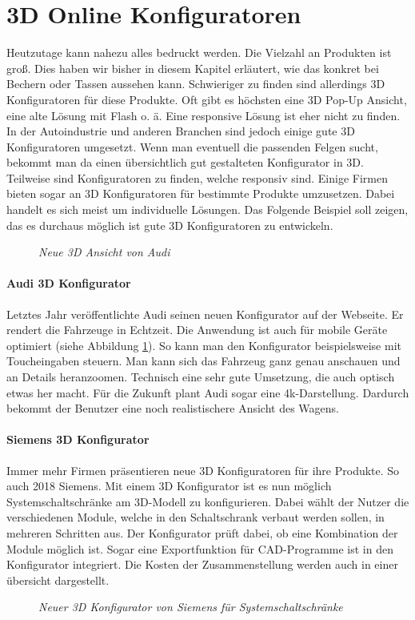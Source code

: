 \section{3D Online Konfiguratoren}
\label{sec:3dconfigurators}
%
Heutzutage kann nahezu alles bedruckt werden. Die Vielzahl an Produkten ist groß. Dies haben wir bisher in diesem Kapitel erläutert, wie das konkret bei Bechern oder Tassen aussehen kann. Schwieriger zu finden sind allerdings 3D Konfiguratoren für diese Produkte. Oft gibt es höchsten eine 3D Pop-Up Ansicht, eine alte Lösung mit Flash o. ä. Eine responsive Lösung ist eher nicht zu finden. \\
In der Autoindustrie und anderen Branchen sind jedoch einige gute 3D Konfiguratoren umgesetzt. Wenn man eventuell die passenden Felgen sucht, bekommt man da einen übersichtlich gut gestalteten Konfigurator in 3D. Teilweise sind Konfiguratoren zu finden, welche responsiv sind. Einige Firmen bieten sogar an 3D Konfiguratoren für bestimmte Produkte umzusetzen. Dabei handelt es sich meist um individuelle Lösungen. Das Folgende Beispiel soll zeigen, das es durchaus möglich ist gute 3D Konfiguratoren zu entwickeln.
%
\begin{figure}[]
	\centering
	{}
	\caption[Audi Konfigurator]{\textit{Neue 3D Ansicht von Audi}}
	\label{fig:audi}
\end{figure}
%
%
\paragraph{Audi 3D Konfigurator}Letztes Jahr veröffentlichte Audi seinen neuen Konfigurator auf der Webseite. Er rendert die Fahrzeuge in Echtzeit. Die Anwendung ist auch für mobile Geräte optimiert (siehe Abbildung \ref{fig:audi}). So kann man den Konfigurator beispielsweise mit Toucheingaben steuern. Man kann sich das Fahrzeug ganz genau anschauen und an Details heranzoomen. Technisch eine sehr gute Umsetzung, die auch optisch etwas her macht. Für die Zukunft plant Audi sogar eine 4k-Darstellung. Dardurch bekommt der Benutzer eine noch realistischere Ansicht des Wagens. \\
%
%
\paragraph{Siemens 3D Konfigurator}Immer mehr Firmen präsentieren neue 3D Konfiguratoren für ihre Produkte. So auch 2018 Siemens. Mit einem 3D Konfigurator ist es nun möglich Systemschaltschränke am 3D-Modell zu konfigurieren. Dabei wählt der Nutzer die verschiedenen Module, welche in den Schaltschrank verbaut werden sollen, in mehreren Schritten aus. Der Konfigurator prüft dabei, ob eine Kombination der Module möglich ist. Sogar eine Exportfunktion für CAD-Programme ist in den Konfigurator integriert. Die Kosten der Zusammenstellung werden auch in einer übersicht dargestellt.\\
%
\begin{figure}[]
	\centering
	{}
	\caption[Audi Konfigurator]{\textit{Neuer 3D Konfigurator von Siemens für Systemschaltschränke}}
	\label{fig:siemens}
\end{figure}
%
